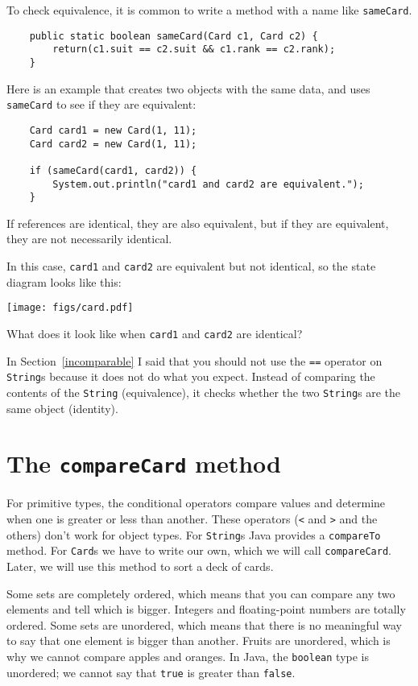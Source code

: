 \documentclass[12pt]{book}
\theoremstyle{definition}
\begin{document}
To check equivalence, it
is common to write a method with a name like {\tt sameCard}.

\begin{lstlisting}
    public static boolean sameCard(Card c1, Card c2) {
        return(c1.suit == c2.suit && c1.rank == c2.rank);
    }
\end{lstlisting}
%
Here is an example that creates two objects with the same data,
and uses {\tt sameCard} to see if they are equivalent:

\begin{lstlisting}
    Card card1 = new Card(1, 11);
    Card card2 = new Card(1, 11);

    if (sameCard(card1, card2)) {
        System.out.println("card1 and card2 are equivalent.");
    }
\end{lstlisting}
%
If references are identical, they are also equivalent,
but if they are equivalent, they are not necessarily identical.

In this case, {\tt card1} and {\tt card2}
are equivalent but not identical, so
the state diagram looks like this:

\texttt{[image: figs/card.pdf]}

What does it look like when
{\tt card1} and {\tt card2} are identical?

In Section~\ref{incomparable} I said that you should not use the 
{\tt ==} operator on {\tt String}s because it does not do what you
expect.  Instead of comparing the contents of the {\tt String}
(equivalence), it checks whether the two {\tt String}s are the same
object (identity).


\section{The {\tt compareCard} method}
\label{compare}

For primitive types, the conditional operators
compare values and determine when one is greater or less
than another.  These operators ({\tt <} and {\tt >} and the others)
don't work for object types.  For {\tt String}s Java provides
a {\tt compareTo} method.  For {\tt Card}s we have
to write our own, which we will call {\tt compareCard}.
Later, we will use this method to sort a deck of cards.


Some sets are completely ordered, which means that you can compare any
two elements and tell which is bigger.  Integers and floating-point
numbers are totally ordered.  Some sets are unordered, which means
that there is no meaningful way to say that one element is bigger than
another.  Fruits are unordered, which is why we cannot compare apples
and oranges.  In Java, the {\tt boolean} type is unordered; we cannot
say that {\tt true} is greater than {\tt false}.
\end{document}
